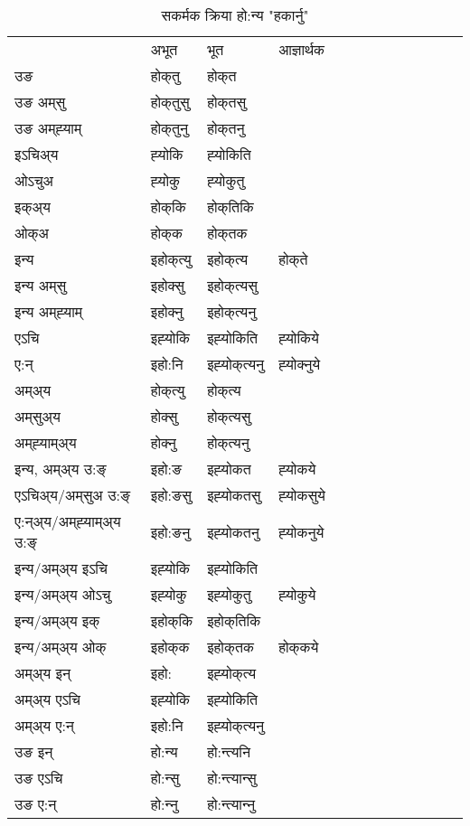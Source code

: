 \begin{table}[H]
\centering
\caption{\label{okt.vt} सकर्मक क्रिया  हो:न्य  "हकार्नु"  }
\begin{tabular}{l|l|l|l|l|l|l|l|l|l|l|l|l}  \toprule
&अभूत & भूत & आज्ञार्थक \\ 
उङ &होक्‌तु &होक्‌त \\ 
उङ अम्‌सु&होक्‌तुसु &होक्‌तसु \\ 
उङ अम्‌ह्‍याम्&होक्‌तुनु &होक्‌तनु \\ 
इऽचिअ्य &ह्‍योकि &ह्‍योकिति   \\ 
ओऽचुअ        &ह्‍योकु &ह्‍योकुतु   \\ 
इक्अ्य&होक्‌कि &होक्‌तिकि   \\ 
ओक्अ &होक्‌क &होक्‌तक   \\ 
इन्य & इहोक्‌त्यु  & इहोक्‌त्य &होक्‌ते  \\ 
इन्य अम्‌सु& इहोक्सु  & इहोक्‌त्यसु   \\ 
इन्य अम्‌ह्‍याम्& इहोक्‍नु  & इहोक्‌त्यनु   \\ 
एऽचि & इह्‍योकि & इह्‍योकिति &ह्‍योकिये    \\ 
ए:न् & इहो:नि  & इह्‍योक्‌त्यनु &ह्‍योक्‍नुये  \\ 
अम्अ्य & होक्‌त्यु  & होक्‌त्य  \\ 
अम्‌सुअ्य & होक्सु & होक्‌त्यसु  \\ 
अम्‌ह्‍याम्अ्य & होक्‍नु  & होक्‌त्यनु \\ 
\midrule
इन्य, अम्अ्य उ:ङ्‌ &इहो:ङ &इह्‍योकत &ह्‍योकये \\ 
एऽचिअ्य/अम्‌सुअ उ:ङ्‌ &इहो:ङसु &इह्‍योकतसु &ह्‍योकसुये \\ 
ए:न्अ्य/अम्‌ह्‍याम्अ्य उ:ङ्‌ &इहो:ङनु &इह्‍योकतनु &ह्‍योकनुये \\ 
इन्य/अम्अ्य इऽचि &इह्‍योकि &इह्‍योकिति    \\ 
इन्य/अम्अ्य ओऽचु &इह्‍योकु &इह्‍योकुतु  &ह्‍योकुये  \\ 
इन्य/अम्अ्य इक् &इहोक्‌कि &इहोक्‌तिकि   \\ 
इन्य/अम्अ्य ओक् &इहोक्‌क &इहोक्‌तक  &होक्‌कये  \\ 
अम्अ्य इन् & इहो: & इह्‍योक्‌त्य   \\ 
अम्अ्य एऽचि & इह्‍योकि & इह्‍योकिति    \\ 
अम्अ्य ए:न् & इहो:नि  & इह्‍योक्‌त्यनु  \\ 
\midrule
उङ इन् & हो:न्य  & हो:न्त्यनि  \\ 
उङ एऽचि & हो:न्सु  & हो:न्त्यान्सु   \\ 
उङ ए:न्& हो:न्‍नु  & हो:न्त्यान्‍नु   \\ 
\bottomrule
\end{tabular}
\end{table}


